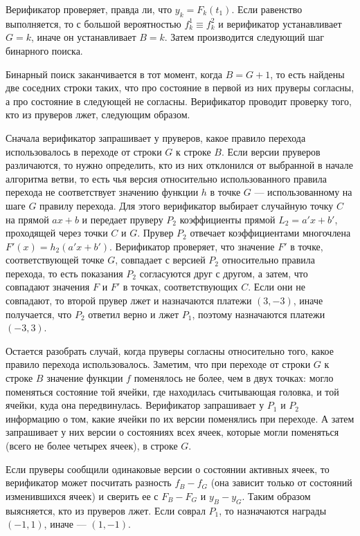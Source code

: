 \documentclass[14pt, a4paper]{extreport}
\begin{document}
        Верификатор проверяет, правда ли, что $y_k = F_k(t_1)$. Если равенство выполняется, то с большой вероятностью $f^1_k \equiv f^2_k$ и верификатор устанавливает $G = k$, иначе он устанавливает $B = k$. Затем производится следующий шаг бинарного поиска.

        Бинарный поиск заканчивается в тот момент, когда $B = G + 1$, то есть найдены две соседних строки таких, что про состояние в первой из них пруверы согласны, а про состояние в следующей не согласны. Верификатор проводит проверку того, кто из пруверов лжет, следующим образом. 

        Сначала верификатор запрашивает у пруверов, какое правило перехода использовалось в переходе от строки $G$ к строке $B$. Если версии пруверов различаются, то нужно определить,
        кто из них отклонился от выбранной в начале алгоритма ветви, то есть чья версия относительно использованного правила перехода не соответствует значению функции $h$ в точке $G$ --- использованному на шаге $G$ правилу перехода. Для этого верификатор выбирает случайную точку $C$ на прямой $a x + b$ и передает пруверу  $P_2$ коэффициенты прямой $L_2 = a'x + b'$, проходящей через точки $C$ и $G$. Прувер $P_2$ отвечает коэффициентами многочлена $F'(x) = h_2(a'x + b')$. Верификатор проверяет, что значение $F'$ в точке, соответствующей точке $G$, совпадает с версией $P_2$ относительно правила перехода, то есть показания $P_2$ согласуются друг с другом, а затем, что совпадают значения $F$ и $F'$ в точках, соответствующих $C$. Если они не совпадают, то второй прувер лжет и назначаются платежи $(3, -3)$, иначе получается, что $P_2$ ответил верно и лжет $P_1$, поэтому назначаются платежи $(-3, 3)$.

        Остается разобрать случай, когда пруверы согласны относительно того, какое правило перехода использовалось. Заметим, что при переходе от строки $G$ к строке $B$ значение функции $f$ поменялось не более, чем в двух точках: могло поменяться состояние той ячейки, где находилась считывающая головка, и той ячейки, куда она передвинулась. Верификатор запрашивает у $P_1$ и $P_2$ информацию о том, какие ячейки по их версии поменялись при переходе. А затем запрашивает у них версии о состояниях всех ячеек, которые могли поменяться (всего не более четырех ячеек), в строке $G$.

        Если пруверы сообщили одинаковые версии о состоянии активных ячеек, то верификатор может посчитать разность $f_B - f_G$ (она зависит только от состояний изменившихся ячеек) и сверить ее с $F_B - F_G$ и $y_B - y_G$. Таким образом выясняется, кто из пруверов лжет. Если соврал $P_1$, то назначаются награды $(-1, 1)$, иначе --- $(1, -1)$.
\end{document}
